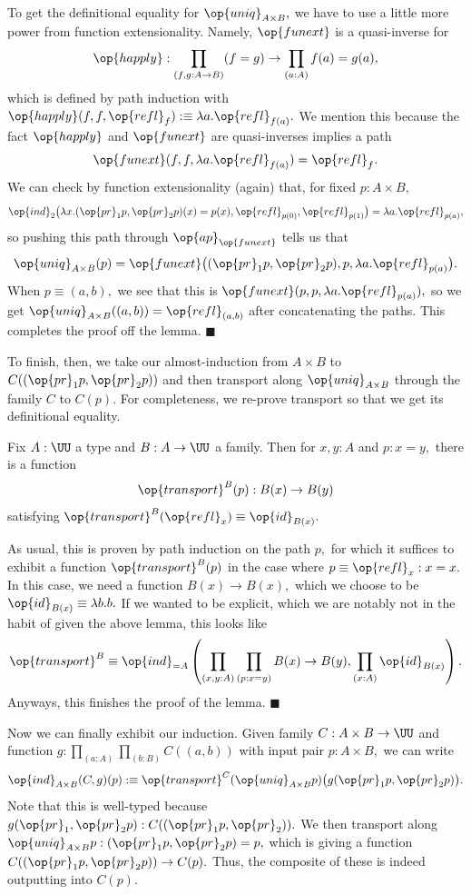 To get the definitional equality for $\op{uniq}_{A\times B},$ we have to use a little more power from function extensionality. Namely, $\op{funext}$ is a quasi-inverse for
\[\op{happly}:\prod_{(f,g:A\to B)}(f=g)\to\prod_{(a:A)}f(a)=g(a),\]
which is defined by path induction with $\op{happly}(f,f,\op{refl}_f):\equiv\lambda a.\op{refl}_{f(a)}.$ We mention this because the fact $\op{happly}$ and $\op{funext}$ are quasi-inverses implies a path
\[\op{funext}(f,f,\lambda a.\op{refl}_{f(a)})=\op{refl}_f.\]
We can check by function extensionality (again) that, for fixed $p:A\times B,$
\[\op{ind}_2\big(\lambda x.(\op{pr}_1p,\op{pr}_2p)(x)=p(x),\op{refl}_{p(0)},\op{refl}_{p(1)}\big)=\lambda a.\op{refl}_{p(a)},\]
so pushing this path through $\op{ap}_{\op{funext}}$ tells us that
\[\op{uniq}_{A\times B}(p)=\op{funext}\big((\op{pr}_1p,\op{pr}_2p),p,\lambda a.\op{refl}_{p(a)}\big).\]
When $p\equiv(a,b),$ we see that this is $\op{funext}(p,p,\lambda a.\op{refl}_{p(a)}),$ so we get $\op{uniq}_{A\times B}((a,b))=\op{refl}_{(a,b)}$ after concatenating the paths. This completes the proof off the lemma. $\blacksquare$

To finish, then, we take our almost-induction from $A\times B$ to $C((\op{pr}_1p,\op{pr}_2p))$ and then transport along $\op{uniq}_{A\times B}$ through the family $C$ to $C(p).$ For completeness, we re-prove transport so that we get its definitional equality.
\begin{lemma}
    Fix $A:\UU$ a type and $B:A\to\UU$ a family. Then for $x,y:A$ and $p:x=y,$ there is a function
    \[\op{transport}^B(p):B(x)\to B(y)\]
    satisfying $\op{transport}^B(\op{refl}_x)\equiv\op{id}_{B(x)}.$
\end{lemma}
As usual, this is proven by path induction on the path $p,$ for which it suffices to exhibit a function $\op{transport}^B(p)$ in the case where $p\equiv\op{refl}_x:x=x.$ In this case, we need a function $B(x)\to B(x),$ which we choose to be $\op{id}_{B(x)}\equiv\lambda b.b.$ If we wanted to be explicit, which we are notably not in the habit of given the above lemma, this looks like
\[\op{transport}^B\equiv\op{ind}_{=A}\left(\prod_{(x,y:A)}\prod_{(p:x=y)}B(x)\to B(y),\prod_{(x:A)}\op{id}_{B(x)}\right).\]
Anyways, this finishes the proof of the lemma. $\blacksquare$

Now we can finally exhibit our induction. Given family $C:A\times B\to\UU$ and function $g:\prod_{(a:A)}\prod_{(b:B)}C((a,b))$ with input pair $p:A\times B,$ we can write
\[\op{ind}_{A\times B}(C,g)(p):\equiv\op{transport}^C(\op{uniq}_{A\times B}p)\big(g(\op{pr}_1p,\op{pr}_2p)\big).\]
Note that this is well-typed because $g(\op{pr}_1,\op{pr}_2p):C((\op{pr}_1p,\op{pr}_2)).$ We then transport along $\op{uniq}_{A\times B}p:(\op{pr}_1p,\op{pr}_2p)=p,$ which is giving a function $C((\op{pr}_1p,\op{pr}_2p))\to C(p).$ Thus, the composite of these is indeed outputting into $C(p).$


